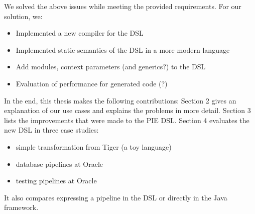 We solved the above issues while meeting the provided requirements.
For our solution, we:
\begin{itemize}
  \item Implemented a new compiler for the DSL
  \item Implemented static semantics of the \ac{DSL} in a more modern language
  \item Add modules, context parameters (and generics?) to the DSL
  \item Evaluation of performance for generated code (?)
\end{itemize}

In the end, this thesis makes the following contributions:
Section 2 gives an explanation of our use cases and explains the problems in more detail.
Section 3 lists the improvements that were made to the \ac{PIE} \ac{DSL}.
Section 4 evaluates the new \ac{DSL} in three case studies:
\begin{itemize}
  \item simple transformation from Tiger (a toy language)
  \item database pipelines at Oracle
  \item testing pipelines at Oracle
\end{itemize}
It also compares expressing a pipeline in the \ac{DSL} or directly in the Java framework.
